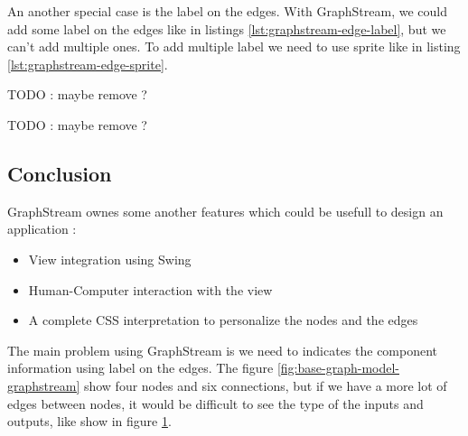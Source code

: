 An another special case is the label on the edges.
With GraphStream, we could add some label on the edges like in listings \ref{lst:graphstream-edge-label}, but we can't add multiple ones.
To add multiple label we need to use sprite like in listing \ref{lst:graphstream-edge-sprite}.

\begin{listing}[p]
  \centering
  \caption[Add a label on an edge with GraphStream]{TODO : maybe remove ?}
  \label{lst:graphstream-edge-label}
\end{listing}

\begin{listing}[p]
  \centering
  \caption[Add two label on an edge with GraphStream]{TODO : maybe remove ?}
  \label{lst:graphstream-edge-sprite}
\end{listing}


\subsection{Conclusion}
\label{sub:Conclusion-gs}

GraphStream ownes some another features which could be usefull to design an application :
\begin{itemize}
\item View integration using Swing
\item Human-Computer interaction with the view
\item A complete CSS interpretation to personalize the nodes and the edges
\end{itemize}

The main problem using GraphStream is we need to indicates the component information using label on the edges. The figure \ref{fig:base-graph-model-graphstream} show four nodes and six connections, but
if we have a more lot of edges between nodes, it would be difficult to see the type of the inputs and outputs, like show in figure \ref{fig:graphstream-lot-of-edges}.

\begin{figure}[h]
  \centering
  \caption[Label on multiple edges using GraphStream]{}
  \label{fig:graphstream-lot-of-edges}
\end{figure}


